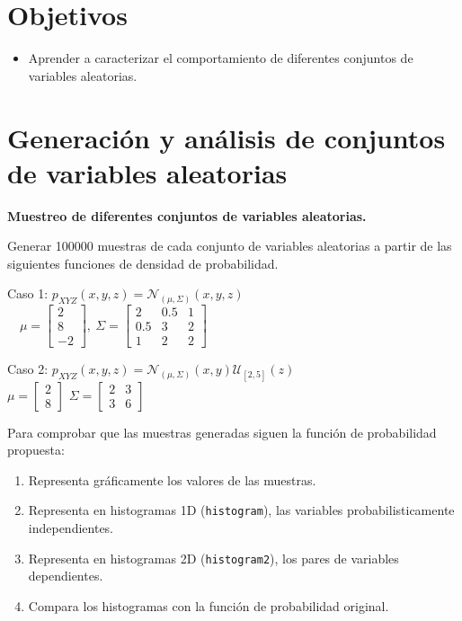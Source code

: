 \documentclass[10pt,twoside,spanish,a4paper]{article}
\begin{document}
\vspace{-8em}

\section*{Objetivos}

\begin{itemize}
	\item Aprender a caracterizar el comportamiento de diferentes conjuntos de variables aleatorias.
\end{itemize}

\section*{Generación y análisis de conjuntos de variables aleatorias}
\begin{itemize}
	\itemP \textbf{Muestreo de diferentes conjuntos de variables aleatorias.}

	Generar 100000 muestras de cada conjunto de variables aleatorias a partir de las siguientes funciones de densidad de probabilidad.

	\begin{itemize}
		\itemR Caso 1: $p_{XYZ}(x,y,z)=\mathcal{N}_{(\mu,\Sigma)}(x,y,z)$\\[2ex]
		$\quad\mu=\left[\begin{matrix}2\\8\\-2\end{matrix}\right],~\Sigma=\left[\begin{matrix}2 & 0.5 & 1\\0.5 & 3 & 2\\1 & 2 & 2\end{matrix}\right]$

		\itemR Caso 2: $p_{XYZ}(x,y,z)=\mathcal{N}_{(\mu,\Sigma)}(x,y)\mathcal{U}_{[2,5]}(z)$\\[2ex]
		$\mu=\left[\begin{matrix}2\\8\end{matrix}\right]$
		$\Sigma=\left[\begin{matrix}2 & 3\\3 & 6\end{matrix}\right]$
	\end{itemize}

	Para comprobar que las muestras generadas siguen la función de probabilidad propuesta:
	\begin{enumerate}[label=\alph*)]
		\item Representa gráficamente los valores de las muestras. 
		\item Representa en histogramas 1D (\color{blue}\texttt{histogram}\color{black}), las variables probabilisticamente independientes.
		\item Representa en histogramas 2D (\color{blue}\texttt{histogram2}\color{black}), los pares de variables dependientes.
		\item Compara los histogramas con la función de probabilidad original.
	\end{enumerate}



\end{itemize}
\end{document}
